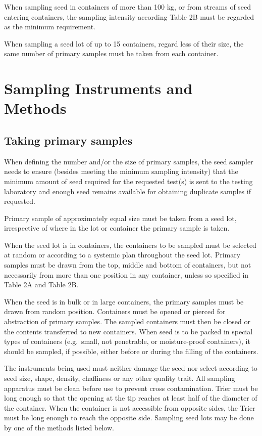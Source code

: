 \documentclass[]{book}
\begin{document}
When sampling seed in containers of more than 100 kg, or from streams of
seed entering containers, the sampling intensity according Table 2B must
be regarded as the minimum requirement.

When sampling a seed lot of up to 15 containers, regard less of their
size, the same number of primary samples must be taken from each
container.

\section{Sampling Instruments and
Methods}\label{sampling-instruments-and-methods}

\subsection{Taking primary samples}\label{taking-primary-samples}

When defining the number and/or the size of primary samples, the seed
sampler needs to ensure (besides meeting the minimum sampling intensity)
that the minimum amount of seed required for the requested test(s) is
sent to the testing laboratory and enough seed remains available for
obtaining duplicate samples if requested.

Primary sample of approximately equal size must be taken from a seed
lot, irrespective of where in the lot or container the primary sample is
taken.

When the seed lot is in containers, the containers to be sampled must be
selected at random or according to a systemic plan throughout the seed
lot. Primary samples must be drawn from the top, middle and bottom of
containers, but not necessarily from more than one position in any
container, unless so specified in Table 2A and Table 2B.

When the seed is in bulk or in large containers, the primary samples
must be drawn from random position. Containers must be opened or pierced
for abstraction of primary samples. The sampled containers must then be
closed or the contents transferred to new containers. When seed is to be
packed in special types of containers (e.g.~small, not penetrable, or
moisture-proof containers), it should be sampled, if possible, either
before or during the filling of the containers.

The instruments being used must neither damage the seed nor select
according to seed size, shape, density, chaffiness or any other quality
trait. All sampling apparatus must be clean before use to prevent cross
contamination. Trier must be long enough so that the opening at the tip
reaches at least half of the diameter of the container. When the
container is not accessible from opposite sides, the Trier must be long
enough to reach the opposite side. Sampling seed lots may be done by one
of the methods listed below.
\end{document}
